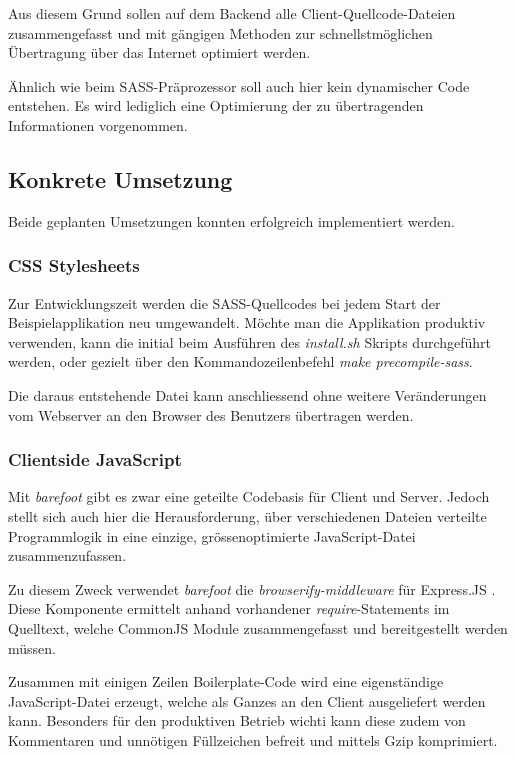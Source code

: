 Aus diesem Grund sollen auf dem Backend alle Client-Quellcode-Dateien zusammengefasst und mit gängigen Methoden zur schnellstmöglichen Übertragung über das Internet optimiert werden.

Ähnlich wie beim SASS-Präprozessor soll auch hier kein dynamischer Code entstehen. Es wird lediglich eine Optimierung der zu übertragenden Informationen vorgenommen.


\subsection*{Konkrete Umsetzung}
Beide geplanten Umsetzungen konnten erfolgreich implementiert werden.

\subsubsection*{CSS Stylesheets}
Zur Entwicklungszeit werden die SASS-Quellcodes bei jedem Start der Beispielapplikation neu umgewandelt. Möchte man die Applikation produktiv verwenden, kann die initial beim Ausführen des \emph{install.sh} Skripts durchgeführt werden, oder gezielt über den Kommandozeilenbefehl \emph{make precompile-sass}.

Die daraus entstehende Datei kann anschliessend ohne weitere Veränderungen vom Webserver an den Browser des Benutzers übertragen werden.

\subsubsection*{Clientside JavaScript}
Mit \emph{barefoot} \cite{Barefoot} gibt es zwar eine geteilte Codebasis für Client und Server. Jedoch stellt sich auch hier die Herausforderung, über verschiedenen Dateien verteilte Programmlogik in eine einzige, grössenoptimierte JavaScript-Datei zusammenzufassen.

Zu diesem Zweck verwendet \emph{barefoot} die \emph{browserify-middleware} für Express.JS \cite{browserifymiddleware}. Diese Komponente ermittelt anhand vorhandener \emph{require}-Statements im Quelltext, welche CommonJS Module \cite{commonjsmodules} zusammengefasst und bereitgestellt werden müssen.

Zusammen mit einigen Zeilen \gls{Boilerplate}-Code wird eine eigenständige JavaScript-Datei erzeugt, welche als Ganzes an den Client ausgeliefert werden kann. Besonders für den produktiven Betrieb wichti kann diese zudem von Kommentaren und unnötigen Füllzeichen befreit und mittels Gzip \cite{gzip} komprimiert.

